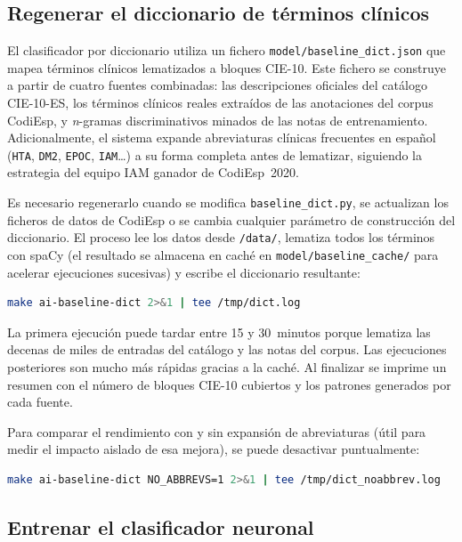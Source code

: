 \subsection{Regenerar el diccionario de términos clínicos}

El clasificador por diccionario utiliza un fichero \texttt{model/baseline\_dict.json} que mapea términos clínicos lematizados a bloques CIE-10. Este fichero se construye a partir de cuatro fuentes combinadas: las descripciones oficiales del catálogo CIE-10-ES, los términos clínicos reales extraídos de las anotaciones del corpus CodiEsp, y \emph{n}-gramas discriminativos minados de las notas de entrenamiento. Adicionalmente, el sistema expande abreviaturas clínicas frecuentes en español (\texttt{HTA}, \texttt{DM2}, \texttt{EPOC}, \texttt{IAM}\dots) a su forma completa antes de lematizar, siguiendo la estrategia del equipo IAM ganador de CodiEsp~2020.

Es necesario regenerarlo cuando se modifica \texttt{baseline\_dict.py}, se actualizan los ficheros de datos de CodiEsp o se cambia cualquier parámetro de construcción del diccionario. El proceso lee los datos desde \texttt{/data/}, lematiza todos los términos con spaCy (el resultado se almacena en caché en \texttt{model/baseline\_cache/} para acelerar ejecuciones sucesivas) y escribe el diccionario resultante:

\begin{lstlisting}[language=bash]
make ai-baseline-dict 2>&1 | tee /tmp/dict.log
\end{lstlisting}

La primera ejecución puede tardar entre 15 y 30~minutos porque lematiza las decenas de miles de entradas del catálogo y las notas del corpus. Las ejecuciones posteriores son mucho más rápidas gracias a la caché. Al finalizar se imprime un resumen con el número de bloques CIE-10 cubiertos y los patrones generados por cada fuente.

Para comparar el rendimiento con y sin expansión de abreviaturas (útil para medir el impacto aislado de esa mejora), se puede desactivar puntualmente:

\begin{lstlisting}[language=bash]
make ai-baseline-dict NO_ABBREVS=1 2>&1 | tee /tmp/dict_noabbrev.log
\end{lstlisting}

\subsection{Entrenar el clasificador neuronal}

